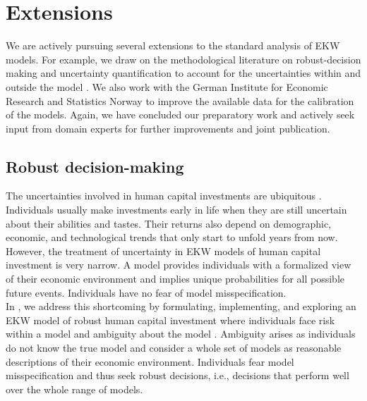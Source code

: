 \section{Extensions}\label{Extensions}
We are actively pursuing several extensions to the standard analysis of EKW models. For example, we draw on the methodological literature on robust-decision making and uncertainty quantification to account for the uncertainties within and outside the model \citep{Hansen.2015}. We also work with the German Institute for Economic Research and Statistics Norway to improve the available data for the calibration of the models. Again, we have concluded our preparatory work and actively seek input from domain experts for further improvements and joint publication.
\subsection{Robust decision-making}
The uncertainties involved in human capital investments are ubiquitous \citep{Becker.1964}. Individuals usually make investments early in life when they are still uncertain about their abilities and tastes. Their returns also depend on demographic, economic, and technological trends that only start to unfold years from now. However, the treatment of uncertainty in EKW models of human capital investment is very narrow. A model provides individuals with a formalized view of their economic environment and implies unique probabilities for all possible future events. Individuals have no fear of model misspecification.\\

\noindent In \citet{Eisenhauer.2020}, we address this shortcoming by formulating, implementing, and exploring an EKW model of robust human capital investment where individuals face risk within a model and ambiguity about the model \citep{Arrow.1951}. Ambiguity arises as individuals do not know the true model and consider a whole set of models as reasonable descriptions of their economic environment. Individuals fear model misspecification and thus seek robust decisions, i.e., decisions that perform well over the whole range of models.\\

